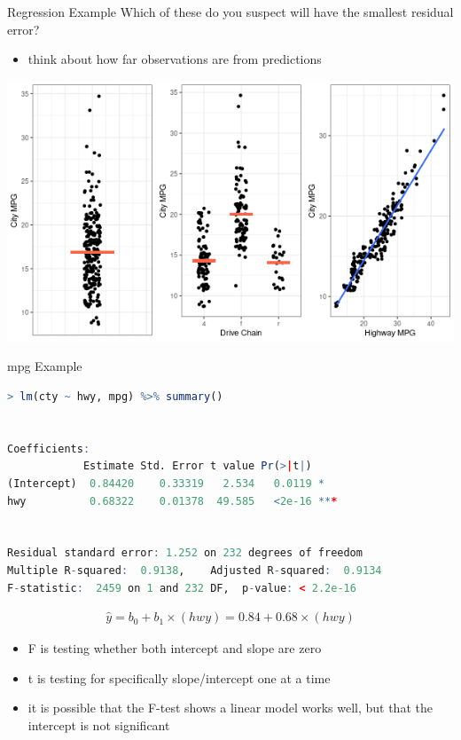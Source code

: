 \documentclass{beamer}
\begin{document}
\begin{frame}{Regression Example}
Which of these do you suspect will have the smallest residual error?
\begin{itemize}
    \item think about how far observations are from predictions
\end{itemize}
\begin{center}
\includegraphics[scale=0.55]{ctympg4.png}
\end{center}
\end{frame}


\begin{frame}[fragile]{mpg Example}

\begin{lstlisting}[language=R]
> lm(cty ~ hwy, mpg) %>% summary()


Coefficients:
            Estimate Std. Error t value Pr(>|t|)    
(Intercept)  0.84420    0.33319   2.534   0.0119 *  
hwy          0.68322    0.01378  49.585   <2e-16 ***


Residual standard error: 1.252 on 232 degrees of freedom
Multiple R-squared:  0.9138,	Adjusted R-squared:  0.9134 
F-statistic:  2459 on 1 and 232 DF,  p-value: < 2.2e-16
\end{lstlisting} \vspace{-4mm}


\begin{align*}
\hat{y} = b_0 + b_1 \times (hwy) = 0.84 + 0.68 \times (hwy)
\end{align*} \vspace{-4mm}

\begin{itemize}
    \item F is testing whether both intercept and slope are zero
    \item t is testing for specifically slope/intercept one at a time
    \item it is possible that the F-test shows a linear model works well, but that the intercept is not significant
\end{itemize}
\end{frame}
\end{document}
